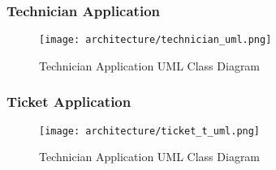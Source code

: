 	\subsubsection{Technician Application}
		\begin{figure}[ht]
			\centering
			\texttt{[image: architecture/technician\_uml.png]}
			\caption{Technician Application UML Class Diagram}
		\end{figure}
	\newpage
	\subsubsection{Ticket Application}
		\begin{figure}[ht]
			\centering
			\texttt{[image: architecture/ticket\_t\_uml.png]}
			\caption{Technician Application UML Class Diagram}
		\end{figure}